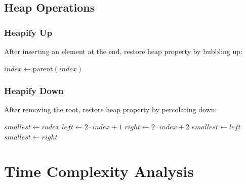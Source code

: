 \documentclass[12pt,a4paper]{article}
\begin{document}
\subsection{Heap Operations}

\subsubsection{Heapify Up}
After inserting an element at the end, restore heap property by bubbling up:

\begin{algorithm}[H]
\caption{Heapify Up}
\begin{algorithmic}[1]
        \State {}
        \State $index \gets \text{parent}(index)$
    \EndWhile
\EndFunction
\end{algorithmic}
\end{algorithm}

\subsubsection{Heapify Down}
After removing the root, restore heap property by percolating down:

\begin{algorithm}[H]
\caption{Heapify Down}
\begin{algorithmic}[1]
    \State $smallest \gets index$
    \State $left \gets 2 \cdot index + 1$
    \State $right \gets 2 \cdot index + 2$
        \State $smallest \gets left$
    \EndIf
        \State $smallest \gets right$
    \EndIf
        \State {}
        \State {}
    \EndIf
\EndFunction
\end{algorithmic}
\end{algorithm}

\section{Time Complexity Analysis}
\end{document}
